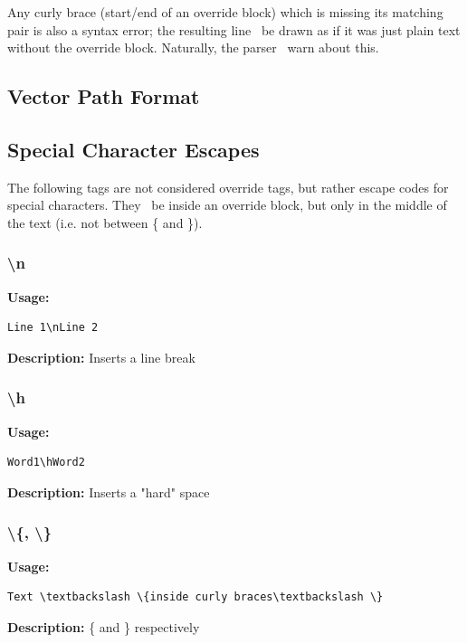 \documentclass{spec}
\begin{document}
Any curly brace (start/end of an override block) which is missing its matching pair is also a syntax error; the
resulting line \must\ be drawn as if it was just plain text without the override block. Naturally, the parser
\should\ warn about this.



\subsection{Vector Path Format}



\subsection{Special Character Escapes}
The following tags are not considered override tags, but rather escape codes for special characters. They
\mustnot\ be inside an override block, but only in the middle of the text (i.e. not between \{ and \}).


\subsubsection{\textbackslash n}
\textbf{Usage:}
\begin{verbatim}
Line 1\nLine 2
\end{verbatim}

\textbf{Description:}
Inserts a line break

\subsubsection{\textbackslash h}
\textbf{Usage:}
\begin{verbatim}
Word1\hWord2
\end{verbatim}

\textbf{Description:}
Inserts a "hard" space

\subsubsection{\textbackslash \{, \textbackslash \}}
\textbf{Usage:}
\begin{verbatim}
Text \textbackslash \{inside curly braces\textbackslash \}
\end{verbatim}

\textbf{Description:}
\{ and \} respectively
\end{document}
